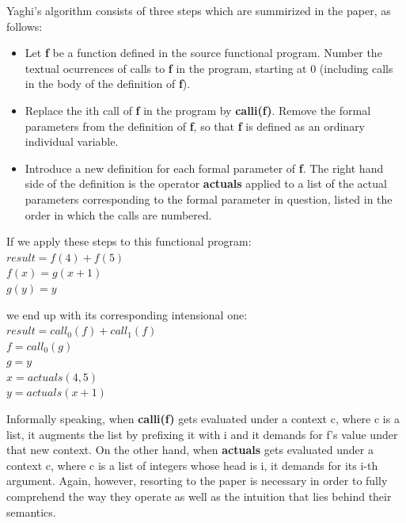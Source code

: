 \documentclass[ack,preface]{dithesis}
\begin{document}
Yaghi's algorithm consists of three steps which are summirized in the paper, as follows:

    \begin{itemize}
    \item Let \textbf{f} be a function defined in the source functional program. Number the textual ocurrences of calls to \textbf{f} in the program, starting at 0 (including calls in the body of the definition of \textbf{f}).
   
   \item Replace the ith call of \textbf{f} in the program by \textbf{calli(f)}. Remove the formal parameters from the definition of \textbf{f}, so that \textbf{f} is defined as an ordinary individual variable.
   
   \item Introduce a new definition for each formal parameter of \textbf{f}. The right hand side of the definition is the operator \textbf{actuals} applied to a list of the actual parameters corresponding to the formal parameter in question, listed in the order in which the calls are numbered.
    \end{itemize}


\begin{flushleft}
If we apply these steps to this functional program:\\
 \setlength{\parindent}{25ex} $result = f(4) + f(5)$ \\
$f(x) = g(x+1)$ \\ 
$g(y) = y$
\end{flushleft}

\begin{flushleft}
we end up with its corresponding intensional one:\\
 \setlength{\parindent}{25ex} $result = call_0(f) + call_1(f)$ \\
$f = call_0(g)$ \\ 
$g = y$ \\
$x = actuals(4,5)$ \\
$y = actuals(x+1)$ \\
\end{flushleft}

Informally speaking, when \textbf{calli(f)} gets evaluated under a context c, where c is  a list, it augments the list by prefixing it with i and it demands for f's value under that new context.  On the other hand, when \textbf{actuals} gets evaluated under a context c, where c is a list of  integers whose head is i, it demands for  its  i-th argument. Again, however, resorting to the paper is necessary in order to fully comprehend the way they operate as well as the intuition that lies behind their semantics.
\end{document}
